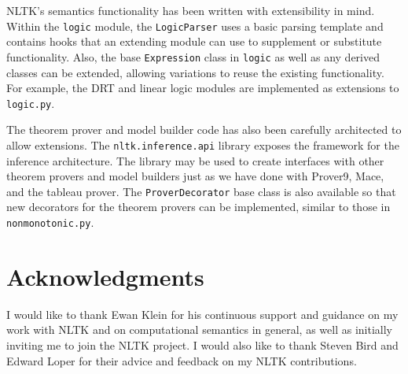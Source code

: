 \documentclass{article}
\newcommand{\dhgcode}[1]{{\tt #1}}
\begin{document}
NLTK's semantics functionality has been written with extensibility in mind.  Within the \dhgcode{logic} module, the \dhgcode{LogicParser} uses a basic parsing template and contains hooks that an extending module can use to supplement or substitute functionality.  Also, the base \dhgcode{Expression} class in \dhgcode{logic} as well as any derived classes can be extended, allowing variations to reuse the existing functionality.  For example, the DRT and linear logic modules are implemented as extensions to \dhgcode{logic.py}.  

The theorem prover and model builder code has also been carefully architected to allow extensions.  The \dhgcode{nltk.inference.api} library exposes the framework for the inference architecture.  The library may be used to create interfaces with other theorem provers and model builders just as we have done with Prover9, Mace, and the tableau prover.  The \dhgcode{ProverDecorator} base class is also available so that new decorators for the theorem provers can be implemented, similar to those in \dhgcode{nonmonotonic.py}.  


\section{Acknowledgments}
I would like to thank Ewan Klein for his continuous support and guidance on my work with NLTK and on computational semantics in general, as well as initially inviting me to join the NLTK project.  I would also like to thank Steven Bird and Edward Loper for their advice and feedback on my NLTK contributions.


{}
\end{document}
